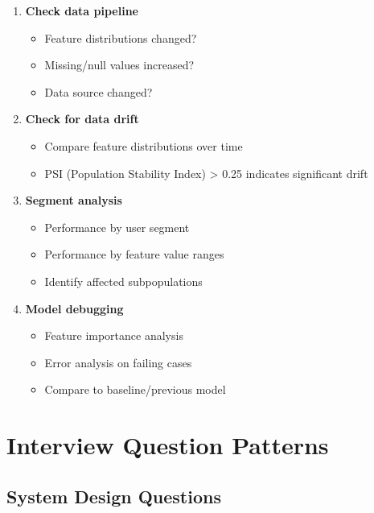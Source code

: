 \begin{enumerate}
    \item \textbf{Check data pipeline}
    \begin{itemize}
        \item Feature distributions changed?
        \item Missing/null values increased?
        \item Data source changed?
    \end{itemize}
    
    \item \textbf{Check for data drift}
    \begin{itemize}
        \item Compare feature distributions over time
        \item PSI (Population Stability Index) > 0.25 indicates significant drift
    \end{itemize}
    
    \item \textbf{Segment analysis}
    \begin{itemize}
        \item Performance by user segment
        \item Performance by feature value ranges
        \item Identify affected subpopulations
    \end{itemize}
    
    \item \textbf{Model debugging}
    \begin{itemize}
        \item Feature importance analysis
        \item Error analysis on failing cases
        \item Compare to baseline/previous model
    \end{itemize}
\end{enumerate}

\section{Interview Question Patterns}
\label{sec:interview_patterns}

\subsection{System Design Questions}

